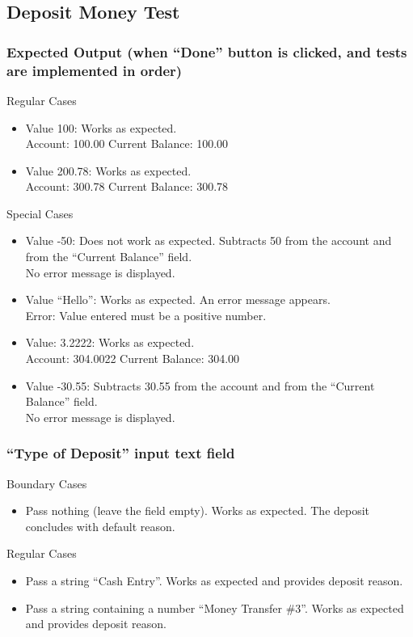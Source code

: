 \documentclass[12pt]{article}
\begin{document}
\subsection{Deposit Money Test}

\subsubsection{Expected Output (when ``Done'' button is clicked, and tests are implemented in order)}

Regular Cases
\begin{itemize}
  \item Value 100: Works as expected.\\
Account: 100.00 Current Balance: 100.00
  \item Value 200.78: Works as expected.\\
Account: 300.78 Current Balance: 300.78
\end{itemize}

Special Cases
\begin{itemize}
  \item Value -50: Does not work as expected. Subtracts 50 from the account and from the ``Current Balance'' field.\\
No error message is displayed.
  \item Value ``Hello'': Works as expected. An error message appears.\\
Error: Value entered must be a positive number.
  \item Value: 3.2222: Works as expected.\\
Account: 304.0022 Current Balance: 304.00
  \item Value -30.55: Subtracts 30.55 from the account and from the ``Current Balance'' field.\\
No error message is displayed.
\end{itemize}

\subsubsection{``Type of Deposit'' input text field}

Boundary Cases
\begin{itemize}
  \item Pass nothing (leave the field empty). Works as expected. The deposit concludes with default reason.
\end{itemize}

Regular Cases
\begin{itemize}
  \item Pass a string  ``Cash Entry''. Works as expected and provides deposit reason.
  \item Pass a string containing a number  ``Money Transfer \#3''. Works as expected and provides deposit reason.
\end{itemize}
\end{document}
